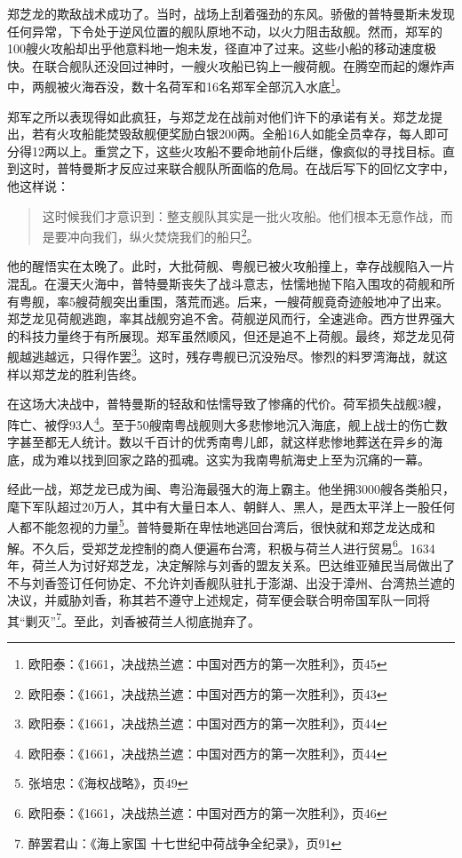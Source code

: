 郑芝龙的欺敌战术成功了。当时，战场上刮着强劲的东风。骄傲的普特曼斯未发现任何异常，下令处于逆风位置的舰队原地不动，以火力阻击敌舰。然而，郑军的100艘火攻船却出乎他意料地一炮未发，径直冲了过来。这些小船的移动速度极快。在联合舰队还没回过神时，一艘火攻船已钩上一艘荷舰。在腾空而起的爆炸声中，两舰被火海吞没，数十名荷军和16名郑军全部沉入水底\footnote{欧阳泰：《1661，决战热兰遮：中国对西方的第一次胜利》，页45}。

郑军之所以表现得如此疯狂，与郑芝龙在战前对他们许下的承诺有关。郑芝龙提出，若有火攻船能焚毁敌舰便奖励白银200两。全船16人如能全员幸存，每人即可分得12两以上。重赏之下，这些火攻船不要命地前仆后继，像疯似的寻找目标。直到这时，普特曼斯才反应过来联合舰队所面临的危局。在战后写下的回忆文字中，他这样说：

\begin{quote}
这时候我们才意识到：整支舰队其实是一批火攻船。他们根本无意作战，而是要冲向我们，纵火焚烧我们的船只\footnote{欧阳泰：《1661，决战热兰遮：中国对西方的第一次胜利》，页43}。

\end{quote}

他的醒悟实在太晚了。此时，大批荷舰、粤舰已被火攻船撞上，幸存战舰陷入一片混乱。在漫天火海中，普特曼斯丧失了战斗意志，怯懦地抛下陷入围攻的荷舰和所有粤舰，率5艘荷舰突出重围，落荒而逃。后来，一艘荷舰竟奇迹般地冲了出来。郑芝龙见荷舰逃跑，率其战舰穷追不舍。荷舰逆风而行，全速逃命。西方世界强大的科技力量终于有所展现。郑军虽然顺风，但还是追不上荷舰。最终，郑芝龙见荷舰越逃越远，只得作罢\footnote{欧阳泰：《1661，决战热兰遮：中国对西方的第一次胜利》，页44}。这时，残存粤舰已沉没殆尽。惨烈的料罗湾海战，就这样以郑芝龙的胜利告终。

在这场大决战中，普特曼斯的轻敌和怯懦导致了惨痛的代价。荷军损失战舰3艘，阵亡、被俘93人\footnote{欧阳泰：《1661，决战热兰遮：中国对西方的第一次胜利》，页44}。至于50艘南粤战舰则大多悲惨地沉入海底，舰上战士的伤亡数字甚至都无人统计。数以千百计的优秀南粤儿郎，就这样悲惨地葬送在异乡的海底，成为难以找到回家之路的孤魂。这实为我南粤航海史上至为沉痛的一幕。

经此一战，郑芝龙已成为闽、粤沿海最强大的海上霸主。他坐拥3000艘各类船只，麾下军队超过20万人，其中有大量日本人、朝鲜人、黑人，是西太平洋上一股任何人都不能忽视的力量\footnote{张培忠：《海权战略》，页49}。普特曼斯在卑怯地逃回台湾后，很快就和郑芝龙达成和解。不久后，受郑芝龙控制的商人便遍布台湾，积极与荷兰人进行贸易\footnote{欧阳泰：《1661，决战热兰遮：中国对西方的第一次胜利》，页46}。1634年，荷兰人为讨好郑芝龙，决定解除与刘香的盟友关系。巴达维亚殖民当局做出了不与刘香签订任何协定、不允许刘香舰队驻扎于澎湖、出没于漳州、台湾热兰遮的决议，并威胁刘香，称其若不遵守上述规定，荷军便会联合明帝国军队一同将其“剿灭”\footnote{醉罢君山：《海上家国 十七世纪中荷战争全纪录》，页91}。至此，刘香被荷兰人彻底抛弃了。

